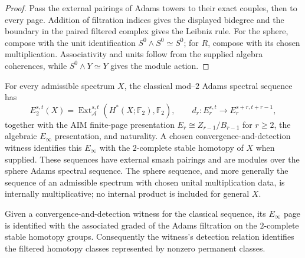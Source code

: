 \begin{proof}
  Pass the external pairings of Adams towers to their exact couples, then to
  every page.  Addition of filtration indices gives the displayed bidegree and
  the boundary in the paired filtered complex gives the Leibniz rule.  For the
  sphere, compose with the unit identification
  $S^0\wedge S^0\simeq S^0$; for $R$, compose with its chosen multiplication.
  Associativity and units follow from the supplied algebra coherences, while
  $S^0\wedge Y\simeq Y$ gives the module action.
\end{proof}

\begin{definition}
  \label{def:classical-adams-ss}
  \notready
  For every admissible spectrum $X$, the classical mod--$2$ Adams spectral
  sequence has
  \[
    E_2^{s,t}(X)=\operatorname{Ext}_{\mathcal A}^{s,t}
      (H^*(X;\mathbb F_2),\mathbb F_2),
    \qquad d_r:E_r^{s,t}\to E_r^{s+r,t+r-1},
  \]
  together with the AIM finite-page presentation
  $E_r\cong Z_{r-1}/B_{r-1}$ for $r\ge2$, the algebraic $E_\infty$
  presentation, and naturality.  A chosen convergence-and-detection witness
  identifies this $E_\infty$ with the $2$-complete stable homotopy of $X$ when
  supplied.  These sequences
  have external smash pairings and are modules over the sphere Adams spectral
  sequence.  The sphere sequence, and more generally the sequence of an
  admissible spectrum with chosen unital multiplication data, is internally
  multiplicative; no internal product is included for general $X$.
\end{definition}

\begin{proposition}
  \label{prop:classical-adams-convergence}
  \notready
  Given a convergence-and-detection witness for the classical sequence, its
  $E_\infty$ page is identified with the associated graded of the Adams
  filtration on the $2$-complete stable homotopy groups.  Consequently the
  witness's detection relation identifies the filtered homotopy classes
  represented by nonzero permanent classes.
\end{proposition}

